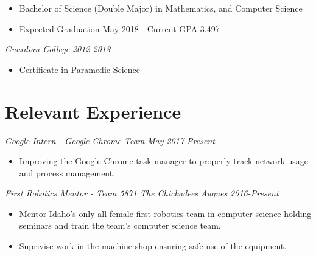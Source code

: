 \documentclass[letterpaper]{article}
\begin{document}
\begin{itemize}
\item Bachelor of Science (Double Major) in  Mathematics, and Computer Science


\item Expected Graduation May 2018 - Current GPA 3.497
\end{itemize}

\vspace{.05in}
\begin{multicols}{2}
\textit{Guardian College}
\vfill
\columnbreak
\textit{2012-2013}
\end{multicols}
\begin{itemize}
      \item Certificate in Paramedic Science 
\end{itemize}
\section*{Relevant Experience}

\begin{multicols}{2}
\textit{Google Intern - Google Chrome Team}
\vfill
\columnbreak
\textit{May 2017-Present}
\end{multicols}
\begin{itemize}
    \item Improving the Google Chrome task manager to properly track network usage and process management.
\end{itemize}

\vspace{.05in}

\begin{multicols}{2}
\textit{First Robotics Mentor - Team 5871 The Chickadees}
\vfill
\columnbreak
\textit{Augues 2016-Present}
\end{multicols}
\begin{itemize}
    \item Mentor Idaho's only all female first robotics team in computer science holding seminars
        and train the team's computer science team.
    \item Suprivise work in the machine shop ensuring safe use of the equipment. 
\end{itemize}
\end{document}
